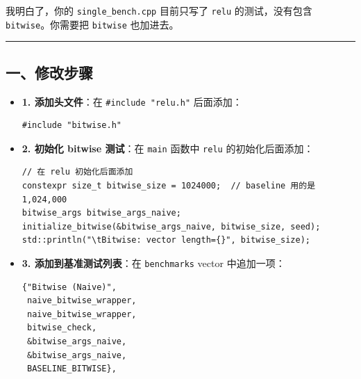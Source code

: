 \documentclass[11pt, a4paper]{article}
\begin{document}
\begin{aibox}
我明白了，你的 \texttt{single\_bench.cpp} 目前只写了 \texttt{relu} 的测试，没有包含 \texttt{bitwise}。你需要把 \texttt{bitwise} 也加进去。

\begin{center}\rule{\textwidth}{0.4pt}\end{center}

\subsection*{一、修改步骤}

\begin{itemize}
    \item \textbf{1. 添加头文件}：在 \texttt{\#include "relu.h"} 后面添加：
    
\begin{tcolorbox}[colback=white,colframe=gray!50!white,boxrule=0.5pt,arc=2pt,left=5pt,right=5pt,top=5pt,bottom=5pt]
\begin{verbatim}
#include "bitwise.h"
\end{verbatim}
\end{tcolorbox}

    \item \textbf{2. 初始化 bitwise 测试}：在 \texttt{main} 函数中 \texttt{relu} 的初始化后面添加：
    
\begin{tcolorbox}[colback=white,colframe=gray!50!white,boxrule=0.5pt,arc=2pt,left=5pt,right=5pt,top=5pt,bottom=5pt]
\begin{verbatim}
// 在 relu 初始化后面添加
constexpr size_t bitwise_size = 1024000;  // baseline 用的是 1,024,000
bitwise_args bitwise_args_naive;
initialize_bitwise(&bitwise_args_naive, bitwise_size, seed);
std::println("\tBitwise: vector length={}", bitwise_size);
\end{verbatim}
\end{tcolorbox}

    \item \textbf{3. 添加到基准测试列表}：在 \texttt{benchmarks} vector 中追加一项：

\begin{tcolorbox}[colback=white,colframe=gray!50!white,boxrule=0.5pt,arc=2pt,left=5pt,right=5pt,top=5pt,bottom=5pt]
\begin{verbatim}
{"Bitwise (Naive)",
 naive_bitwise_wrapper,
 naive_bitwise_wrapper,
 bitwise_check,
 &bitwise_args_naive,
 &bitwise_args_naive,
 BASELINE_BITWISE},
\end{verbatim}
\end{tcolorbox}


\end{itemize}
\end{aibox}
\end{document}

